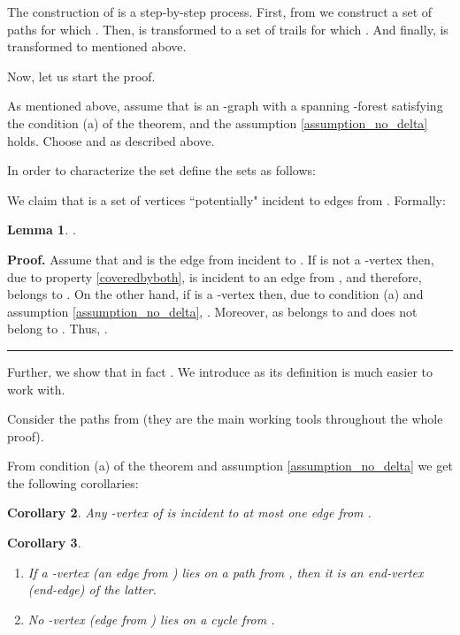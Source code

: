 \documentclass[a4paper, 12pt]{article}
\newtheorem{lemma}{Lemma}[subsection]
\newtheorem{corollary}[lemma]{Corollary}
\newenvironment{proof}[1][Proof]{\noindent\textbf{#1.} }{\ \rule{0.5em}{0.5em}}
\begin{document}
The construction of  is a step-by-step process. First, from
 we construct a set of paths  for which . Then,  is transformed to a set of
trails  for which . And finally,  is
transformed to  mentioned above.

\bigskip

Now, let us start the proof.

As mentioned above, assume that  is an -graph with a spanning
-forest  satisfying the condition (a) of the theorem, and the
assumption \ref{assumption_no_delta} holds. Choose  and
 as described above.

In order to characterize the set  define the sets  as follows:





We claim that  is a set of vertices ``potentially" incident to
edges from . Formally:
\begin{lemma}\label{QinR}
.
\end{lemma}
\begin{proof}
Assume that  and  is the edge from 
incident to . If  is not a -vertex then, due to property
\ref{coveredbyboth},  is incident to an edge from , and therefore, belongs to . On the other
hand, if  is a -vertex then, due to condition (a) and
assumption \ref{assumption_no_delta}, . Moreover,  as  belongs to  and does not belong to .
Thus, .
\end{proof}

Further, we show that in fact . We introduce  as its
definition is much easier to work with.

Consider the paths from  (they are the main working tools
throughout the whole proof).

\bigskip

From condition (a) of the theorem and assumption
\ref{assumption_no_delta} we get the following corollaries:
\begin{corollary} \label{one_is_not_incident_to_two}
Any -vertex of  is incident to at most one edge from .
\end{corollary}

\begin{corollary} \label{U_on_paths}\
\renewcommand{\labelenumi}{(\arabic{enumi})}
\begin{enumerate}
\item \label{one_is_end_vertex} If a -vertex (an edge from )
lies on a path from , then it is an end-vertex (end-edge)
of the latter.

\item \label{no_U_lies_on_cycles} No -vertex (edge from ) lies on a cycle
from .
\end{enumerate}
\end{corollary}
\end{document}
